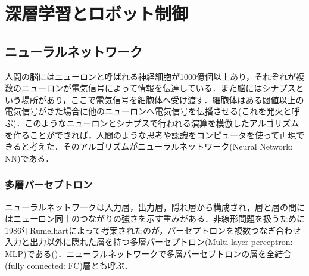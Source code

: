 \chapter{深層学習とロボット制御}
\label{chap_review}

\section{ニューラルネットワーク}\label{sec:NeuralNetwork}
人間の脳にはニューロンと呼ばれる神経細胞が1000億個以上あり，それぞれが複数のニューロンが電気信号によって情報を伝達している．また脳にはシナプスという場所があり，ここで電気信号を細胞体へ受け渡す．細胞体はある閾値以上の電気信号がきた場合に他のニューロンへ電気信号を伝播させる(これを発火と呼ぶ)．このようなニューロンとシナプスで行われる演算を模倣したアルゴリズムを作ることができれば，人間のような思考や認識をコンピュータを使って再現できると考えた．そのアルゴリズムがニューラルネットワーク(Neural Network: NN)である．

\subsection{多層パーセプトロン}
ニューラルネットワークは入力層，出力層，隠れ層から構成され，層と層の間にはニューロン同士のつながりの強さを示す重みがある．非線形問題を扱うために1986年Rumelhartによって考案されたのが，パーセプトロンを複数つなぎ合わせ入力と出力以外に隠れた層を持つ多層パーセプトロン(Multi-layer perceptron: MLP)である()．ニューラルネットワークで多層パーセプトロンの層を全結合(fully connected: FC)層とも呼ぶ．

